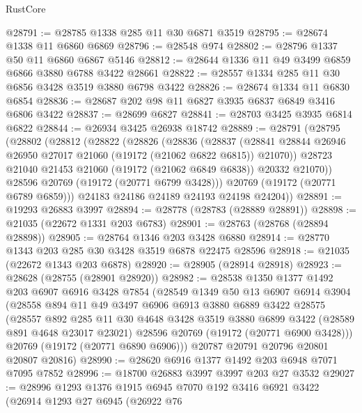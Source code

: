 \begin{lexlean}{RustCore}
\begin{coremodule}
@28791 := @28785 @1338 @285 @11 @30 @6871 @3519
@28795 := @28674 @1338 @11 @6860 @6869
@28796 := @28548 @974
@28802 := @28796 @1337 @50 @11 @6860 @6867 @5146
@28812 := @28644 @1336 @11 @49 @3499 @6859 @6866 @3880 @6788 @3422 @28661
@28822 := @28557 @1334 @285 @11 @30 @6856 @3428 @3519 @3880 @6798 @3422
@28826 := @28674 @1334 @11 @6830 @6854
@28836 := @28687 @202 @98 @11 @6827 @3935 @6837 @6849 @3416 @6806 @3422
@28837 := @28699 @6827
@28841 := @28703 @3425 @3935 @6814 @6822
@28844 := @26934 @3425 @26938 @18742
@28889 := @28791
    (@28795
      (@28802
        (@28812
          (@28822
            (@28826
              (@28836
                (@28837
                  (@28841 @28844 @26946 @26950 @27017 @21060 (@19172 (@21062 @6822 @6815)) @21070))
                @28723
                @21040
                @21453
                @21060
                (@19172 (@21062 @6849 @6838))
                @20332
                @21070))
            @28596
            @20769
            (@19172 (@20771 @6799 @3428)))
          @20769
          (@19172 (@20771 @6789 @6859)))
        @24183
        @24186
        @24189
        @24193
        @24198
        @24204))
@28891 := @19293 @26883 @3997
@28894 := @28778 (@28783 (@28889 @28891))
@28898 := @21035 (@22672 @1331 @203 @6783)
@28901 := @28763 (@28768 (@28894 @28898))
@28905 := @28764 @1346 @203 @3428 @6880
@28914 := @28770 @1343 @203 @285 @30 @3428 @3519 @6878 @22475 @28596
@28918 := @21035 (@22672 @1343 @203 @6878)
@28920 := @28905 (@28914 @28918)
@28923 := @28628 (@28755 (@28901 @28920))
@28982 := @28538
    @1350
    @1377
    @1492
    @203
    @6907
    @6916
    @3428
    @7854
    (@28549
      @1349
      @50
      @13
      @6907
      @6914
      @3904
      (@28558
        @894
        @11
        @49
        @3497
        @6906
        @6913
        @3880
        @6889
        @3422
        @28575
        (@28557
          @892
          @285
          @11
          @30
          @4648
          @3428
          @3519
          @3880
          @6899
          @3422
          (@28589 @891 @4648 @23017 @23021)
          @28596
          @20769
          (@19172 (@20771 @6900 @3428)))
        @20769
        (@19172 (@20771 @6890 @6906)))
      @20787
      @20791
      @20796
      @20801
      @20807
      @20816)
@28990 := @28620 @6916 @1377 @1492 @203 @6948 @7071 @7095 @7852
@28996 := @18700 @26883 @3997 @3997 @203 @27 @3532
@29027 := @28996
    @1293
    @1376
    @1915
    @6945
    @7070
    @192
    @3416
    @6921
    @3422
    (@26914
      @1293
      @27
      @6945
      (@26922
        @76

\end{coremodule}
\end{lexlean}
